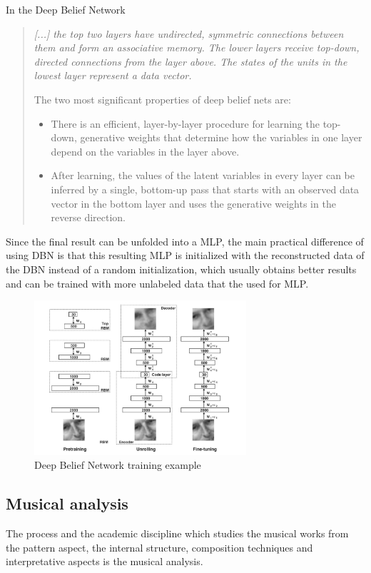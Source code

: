 \documentclass[a4paper,openany,oneside,12pt]{book}
\begin{document}
In the Deep Belief Network
\begin{quote}
\em [...] the top two layers have undirected, symmetric connections between them and form an associative memory. The lower layers receive top-down, directed connections from the layer above. The states of the units in the lowest layer represent a data vector.

The two most significant properties of deep belief nets are:

\begin{itemize}
\item There is an efficient, layer-by-layer procedure for learning the top-down, generative weights that determine how the variables in one layer depend on the variables in the layer above. 

\item After learning, the values of the latent variables in every layer can be inferred by a single, bottom-up pass that starts with an observed data vector in the bottom layer and uses the generative weights in the reverse direction.\cite{Hinton:2009}
\end{itemize}
\end{quote}

Since the final result can be unfolded into a MLP, the main practical difference of using DBN is that this resulting MLP is initialized with the reconstructed data of the DBN instead of a random initialization, which usually obtains better results and can be trained with more unlabeled data that the used for MLP.


\begin{figure}
\centering
\includegraphics[width=0.7\textwidth]{img/dbn_model.png} 
\caption{Deep Belief Network training example\cite{rparedesNN}} \label{fig:dbn}
\end{figure}


\subsection{Musical analysis}\label{musical_analysis}
The process and the academic discipline which studies the musical works from the pattern aspect, the internal structure, composition techniques and interpretative aspects is the musical analysis.
\end{document}
